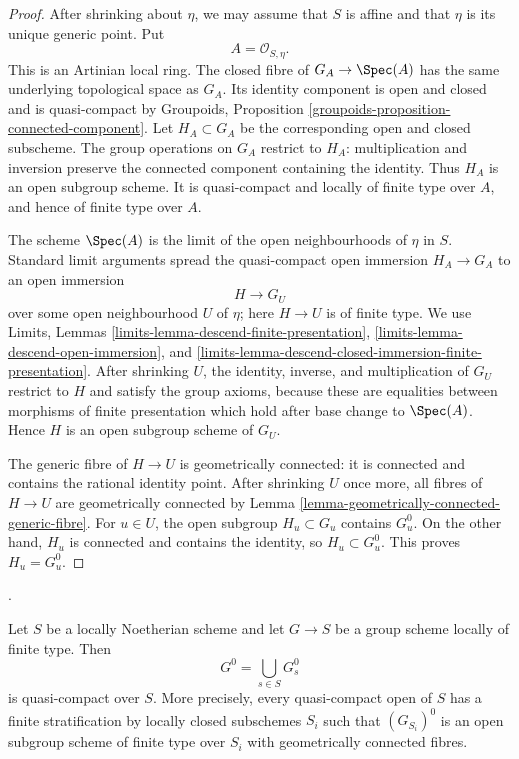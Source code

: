 \begin{proof}
After shrinking about $\eta$, we may assume that $S$ is affine and that
$\eta$ is its unique generic point. Put
$$
A = \mathcal{O}_{S, \eta}.
$$
This is an Artinian local ring. The closed fibre of $G_A \to \Spec(A)$
has the same underlying topological space as $G_A$. Its identity component
is open and closed and is quasi-compact by Groupoids, Proposition
\ref{groupoids-proposition-connected-component}. Let $H_A \subset G_A$
be the corresponding open and closed subscheme. The group operations on
$G_A$ restrict to $H_A$: multiplication and inversion preserve the
connected component containing the identity. Thus $H_A$ is an open subgroup
scheme. It is quasi-compact and locally of finite type over $A$, and hence
of finite type over $A$.

The scheme $\Spec(A)$ is the limit of the open neighbourhoods of $\eta$ in
$S$. Standard limit arguments spread the quasi-compact open immersion
$H_A \to G_A$ to an open immersion
$$
H \longrightarrow G_U
$$
over some open neighbourhood $U$ of $\eta$; here $H \to U$ is of finite
type. We use Limits, Lemmas
\ref{limits-lemma-descend-finite-presentation},
\ref{limits-lemma-descend-open-immersion}, and
\ref{limits-lemma-descend-closed-immersion-finite-presentation}.
After shrinking $U$, the identity, inverse, and multiplication of $G_U$
restrict to $H$ and satisfy the group axioms, because these are equalities
between morphisms of finite presentation which hold after base change to
$\Spec(A)$. Hence $H$ is an open subgroup scheme of $G_U$.

The generic fibre of $H \to U$ is geometrically connected: it is connected
and contains the rational identity point. After shrinking $U$ once more,
all fibres of $H \to U$ are geometrically connected by
Lemma \ref{lemma-geometrically-connected-generic-fibre}. For $u \in U$,
the open subgroup $H_u \subset G_u$ contains $G_u^0$. On the other hand,
$H_u$ is connected and contains the identity, so $H_u \subset G_u^0$.
This proves $H_u = G_u^0$.
\end{proof}

\begin{lemma}
\label{lemma-identity-component-locus-quasi-compact}
\begin{reference}
\cite[Expos\'e 236, Theorem 1.1(i) and Lemma 1.2,
pp. 224--225]{FGA}.
\end{reference}
Let $S$ be a locally Noetherian scheme and let $G \to S$ be a group scheme
locally of finite type. Then
$$
G^0 = \bigcup_{s \in S} G_s^0
$$
is quasi-compact over $S$. More precisely, every quasi-compact open of $S$
has a finite stratification by locally closed subschemes $S_i$ such that
$(G_{S_i})^0$ is an open subgroup scheme of finite type over $S_i$ with
geometrically connected fibres.
\end{lemma}

